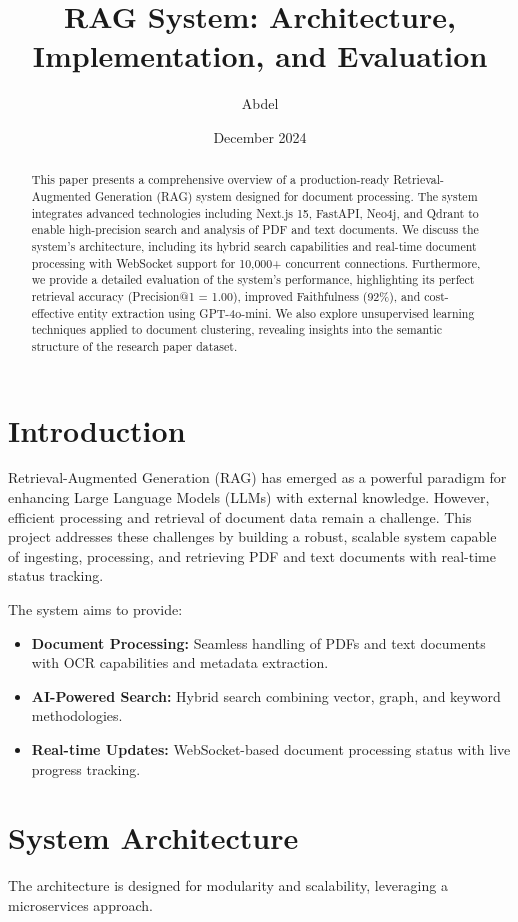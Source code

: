 \documentclass[a4paper,12pt]{article}
\title{\textbf{RAG System: Architecture, Implementation, and Evaluation}}
\author{Abdel }
\date{December 2024}
\begin{document}
\maketitle

\begin{abstract}
This paper presents a comprehensive overview of a production-ready Retrieval-Augmented Generation (RAG) system designed for document processing. The system integrates advanced technologies including Next.js 15, FastAPI, Neo4j, and Qdrant to enable high-precision search and analysis of PDF and text documents. We discuss the system's architecture, including its hybrid search capabilities and real-time document processing with WebSocket support for 10,000+ concurrent connections. Furthermore, we provide a detailed evaluation of the system's performance, highlighting its perfect retrieval accuracy (Precision@1 = 1.00), improved Faithfulness (92\%), and cost-effective entity extraction using GPT-4o-mini. We also explore unsupervised learning techniques applied to document clustering, revealing insights into the semantic structure of the research paper dataset.
\end{abstract}

\section{Introduction}
Retrieval-Augmented Generation (RAG) has emerged as a powerful paradigm for enhancing Large Language Models (LLMs) with external knowledge. However, efficient processing and retrieval of document data remain a challenge. This project addresses these challenges by building a robust, scalable system capable of ingesting, processing, and retrieving PDF and text documents with real-time status tracking.

The system aims to provide:
\begin{itemize}
    \item \textbf{Document Processing:} Seamless handling of PDFs and text documents with OCR capabilities and metadata extraction.
    \item \textbf{AI-Powered Search:} Hybrid search combining vector, graph, and keyword methodologies.
    \item \textbf{Real-time Updates:} WebSocket-based document processing status with live progress tracking.
\end{itemize}

\section{System Architecture}
The architecture is designed for modularity and scalability, leveraging a microservices approach.
\end{document}
